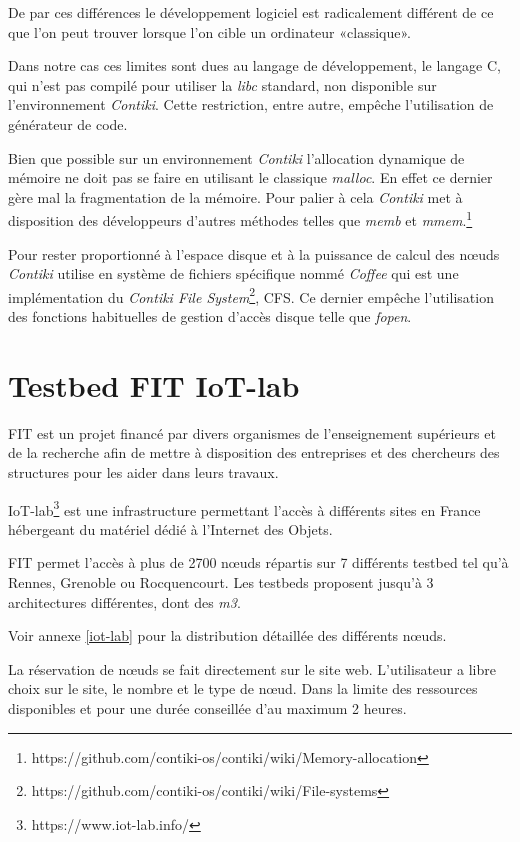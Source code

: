 De par ces différences le développement logiciel est radicalement différent de ce que l'on peut trouver lorsque l'on cible un ordinateur «classique».

Dans notre cas ces limites sont dues au langage de développement, le langage C, qui n'est pas compilé pour utiliser la \emph{libc} standard, non disponible sur l'environnement \emph{Contiki}. Cette restriction, entre autre, empêche l'utilisation de générateur de code.

Bien que possible sur un environnement \emph{Contiki} l'allocation dynamique de mémoire ne doit pas se faire en utilisant le classique \emph{malloc}. En effet ce dernier gère mal la fragmentation de la mémoire. Pour palier à cela \emph{Contiki} met à disposition des développeurs d'autres méthodes telles que \emph{memb} et \emph{mmem}.\footnote{https://github.com/contiki-os/contiki/wiki/Memory-allocation}

Pour rester proportionné à l'espace disque et à la puissance de calcul des nœuds \emph{Contiki} utilise en système de fichiers spécifique nommé \emph{Coffee} qui est une  implémentation du \emph{Contiki File System}\footnote{https://github.com/contiki-os/contiki/wiki/File-systems}, CFS. Ce dernier empêche l'utilisation des fonctions habituelles de gestion d'accès disque telle que \emph{fopen}.


\section{Testbed FIT IoT-lab}

FIT est un projet financé par divers organismes de l'enseignement supérieurs et de la recherche afin de mettre à disposition des entreprises et des chercheurs des structures pour les aider dans leurs travaux.

IoT-lab\footnote{https://www.iot-lab.info/} est une infrastructure permettant l'accès à différents sites en France hébergeant du matériel dédié à l'Internet des Objets.

FIT permet l'accès à plus de 2700 nœuds répartis sur 7 différents testbed tel qu'à Rennes, Grenoble ou Rocquencourt. Les testbeds proposent jusqu'à 3 architectures différentes, dont des \emph{m3}.

Voir annexe \ref{iot-lab} pour la distribution détaillée des différents nœuds.

La réservation de nœuds se fait directement sur le site web. L'utilisateur a libre choix sur le site, le nombre et le type de nœud. Dans la limite des ressources disponibles et pour une durée conseillée d'au maximum 2 heures.

